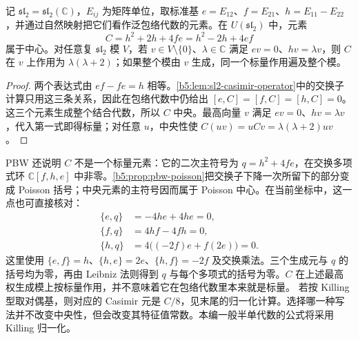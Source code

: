 \begin{proposition}\label{b5:prop:sl2-casimir-central}
	记 \(\mathfrak{sl}_2=\mathfrak{sl}_2(\mathbb C)\)，\(E_{ij}\) 为矩阵单位，取标准基 \(e=E_{12}\)、\(f=E_{21}\)、\(h=E_{11}-E_{22}\)，并通过自然映射把它们看作泛包络代数的元素。在 \(U(\mathfrak{sl}_2)\) 中，元素
	\[
		C=h^2+2h+4fe=h^2-2h+4ef
	\]
	属于中心。对任意复 \(\mathfrak{sl}_2\) 模 \(V\)，若 \(v\in V\setminus\{0\}\)、\(\lambda\in\mathbb C\) 满足 \(ev=0\)、\(hv=\lambda v\)，则 \(C\) 在 \(v\) 上作用为 \(\lambda(\lambda+2)\)；如果整个模由 \(v\) 生成，同一个标量作用遍及整个模。
\end{proposition}
\begin{proof}
	两个表达式由 \(ef-fe=h\) 相等。\cref{b5:lem:sl2-casimir-operator}中的交换子计算只用这三条关系，因此在包络代数中仍给出 \([e,C]=[f,C]=[h,C]=0\)。这三个元素生成整个结合代数，所以 \(C\) 中央。最高向量 \(v\) 满足 \(ev=0\)、\(hv=\lambda v\)，代入第一式即得标量；对任意 \(u\)，中央性使 \(C(uv)=uCv=\lambda(\lambda+2)uv\)。
\end{proof}
PBW 还说明 \(C\) 不是一个标量元素：它的二次主符号为 \(q=h^2+4fe\)，在交换多项式环 \(\mathbb C[f,h,e]\) 中非零。\cref{b5:prop:pbw-poisson}把交换子下降一次所留下的部分变成 Poisson 括号；中央元素的主符号因而属于 Poisson 中心。在当前坐标中，这一点也可直接核对：
\[
	\begin{aligned}
		\{e,q\}&=-4he+4he=0,\\
		\{f,q\}&=4hf-4fh=0,\\
		\{h,q\}&=4\bigl((-2f)e+f(2e)\bigr)=0.
	\end{aligned}
\]
这里使用 \(\{e,f\}=h\)、\(\{h,e\}=2e\)、\(\{h,f\}=-2f\) 及交换乘法。三个生成元与 \(q\) 的括号均为零，再由 Leibniz 法则得到 \(q\) 与每个多项式的括号为零。\(C\) 在上述最高权生成模上按标量作用，并不意味着它在包络代数里本来就是标量。
\ProseParagraphBreak
若按 Killing 型取对偶基，则对应的 Casimir 元是 \(C/8\)，见末尾的归一化计算。选择哪一种写法并不改变中央性，但会改变其特征值常数。本编一般半单代数的公式将采用 Killing 归一化。
